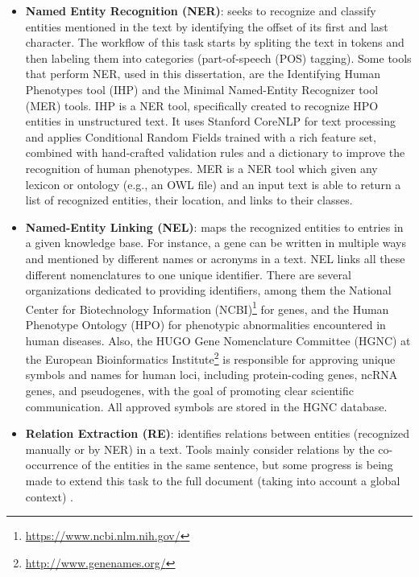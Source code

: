 \begin{itemize}

\item{\textbf{Named Entity Recognition (NER)}: seeks to recognize and classify entities mentioned in the text by identifying the offset of its first and last character. The workflow of this task starts by spliting the text in tokens and then labeling them into categories (part-of-speech (POS) tagging). Some tools that perform NER, used in this dissertation, are the Identifying Human Phenotypes tool (IHP) \citep{IHP} and the Minimal Named-Entity Recognizer tool (MER) \citep{MER} tools. IHP is a NER tool, specifically created to recognize HPO entities in unstructured text. It uses Stanford CoreNLP \citep{Manning2014} for text processing and applies Conditional Random Fields trained with a rich feature set, combined with hand-crafted validation rules and a dictionary to improve the recognition of human phenotypes. MER is a NER tool which given any lexicon or ontology (e.g., an OWL file) and an input text is able to return a list of recognized entities, their location, and links to their classes.}

\item{\textbf{Named-Entity Linking (NEL)}: maps the recognized entities to entries in a given knowledge base. For instance, a gene can be written in multiple ways and mentioned by different names or acronyms in a text. NEL links all these different nomenclatures to one unique identifier. There are several organizations dedicated to providing identifiers, among them the National Center for Biotechnology Information (NCBI)\footnote{\url{https://www.ncbi.nlm.nih.gov/}} for genes, and the Human Phenotype Ontology (HPO) \citep{HPO} for phenotypic abnormalities encountered in human diseases. Also, the HUGO Gene Nomenclature Committee (HGNC) at the European Bioinformatics Institute\footnote{\url{http://www.genenames.org/}} is responsible for approving unique symbols and names for human loci, including protein-coding genes, ncRNA genes, and pseudogenes, with the goal of promoting clear scientific communication. All approved symbols are stored in the HGNC database.}

\item{\textbf{Relation Extraction (RE)}: identifies relations between entities (recognized manually or by NER) in a text. Tools mainly consider relations by the co-occurrence of the entities in the same sentence, but some progress is being made to extend this task to the full document (taking into account a global context) \citep{Singhal2016TextMG}.}

\end{itemize}

